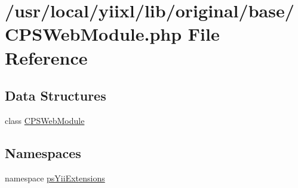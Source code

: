 \hypertarget{CPSWebModule_8php}{
\section{/usr/local/yiixl/lib/original/base/CPSWebModule.php File Reference}
\label{CPSWebModule_8php}
}
\subsection*{Data Structures}
\begin{DoxyCompactItemize}
\item 
class \hyperlink{classCPSWebModule}{CPSWebModule}
\end{DoxyCompactItemize}
\subsection*{Namespaces}
\begin{DoxyCompactItemize}
\item 
namespace \hyperlink{namespacepsYiiExtensions}{psYiiExtensions}
\end{DoxyCompactItemize}
